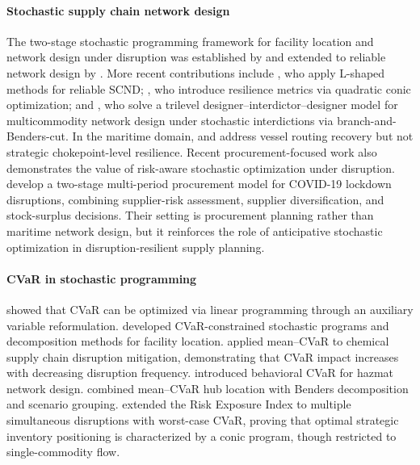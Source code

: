 \documentclass[final,3p,authoryear]{elsarticle}
\theoremstyle{definition}
\begin{document}
\paragraph{Stochastic supply chain network design}
The two-stage stochastic programming framework for facility location and
network design under disruption was established by \cite{snyder2005}
and extended to reliable network design by \cite{lim2010}. More recent
contributions include \cite{tolooie2020}, who apply L-shaped
methods for reliable SCND; \cite{fattahi2020}, who
introduce resilience metrics via quadratic conic optimization; and \cite{vaziri2025}, who solve a trilevel
designer--interdictor--designer model for multicommodity network design
under stochastic interdictions via branch-and-Benders-cut. In the maritime
domain, \cite{brouer2014} and \cite{koza2020}
address vessel routing recovery but not strategic chokepoint-level
resilience. Recent procurement-focused work also demonstrates the value of risk-aware stochastic optimization under disruption. \cite{chase2025multi} develop a two-stage multi-period procurement model for COVID-19 lockdown disruptions, combining supplier-risk assessment, supplier diversification, and stock-surplus decisions. Their setting is procurement planning rather than maritime network design, but it reinforces the role of anticipative stochastic optimization in disruption-resilient supply planning.

\paragraph{CVaR in stochastic programming}
\cite{rockafellar2000} showed that CVaR can be optimized via
linear programming through an auxiliary variable reformulation. \cite{noyan2012} developed CVaR-constrained stochastic programs and decomposition
methods for facility location. \cite{carneiro2010risk} applied
mean--CVaR to chemical supply chain disruption mitigation, demonstrating
that CVaR impact increases with decreasing disruption frequency. \cite{liu2020} introduced behavioral CVaR for hazmat network design.
\cite{ghaffarinasab2023} combined mean--CVaR hub location with Benders
decomposition and scenario grouping. \cite{gao2019}
extended the Risk Exposure Index to multiple simultaneous disruptions with
worst-case CVaR, proving that optimal strategic inventory positioning is
characterized by a conic program, though restricted to single-commodity
flow. 
\end{document}
